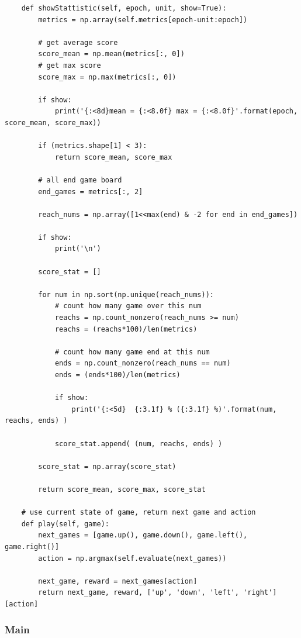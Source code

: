 \documentclass[12pt]{article}
\begin{document}
\begin{verbatim}
    def showStattistic(self, epoch, unit, show=True):
        metrics = np.array(self.metrics[epoch-unit:epoch])
        
        # get average score
        score_mean = np.mean(metrics[:, 0])
        # get max score
        score_max = np.max(metrics[:, 0])
        
        if show:
            print('{:<8d}mean = {:<8.0f} max = {:<8.0f}'.format(epoch, score_mean, score_max))
        
        if (metrics.shape[1] < 3):
            return score_mean, score_max
        
        # all end game board
        end_games = metrics[:, 2]
        
        reach_nums = np.array([1<<max(end) & -2 for end in end_games])
                  
        if show:
            print('\n')
        
        score_stat = []
        
        for num in np.sort(np.unique(reach_nums)):
            # count how many game over this num
            reachs = np.count_nonzero(reach_nums >= num)
            reachs = (reachs*100)/len(metrics)
            
            # count how many game end at this num
            ends = np.count_nonzero(reach_nums == num)
            ends = (ends*100)/len(metrics)
            
            if show:
                print('{:<5d}  {:3.1f} % ({:3.1f} %)'.format(num, reachs, ends) )
            
            score_stat.append( (num, reachs, ends) )
        
        score_stat = np.array(score_stat)
        
        return score_mean, score_max, score_stat
    
    # use current state of game, return next game and action
    def play(self, game):
        next_games = [game.up(), game.down(), game.left(), game.right()]
        action = np.argmax(self.evaluate(next_games))
                
        next_game, reward = next_games[action]
        return next_game, reward, ['up', 'down', 'left', 'right'][action]
\end{verbatim}

\subsubsection{Main}
\end{document}
